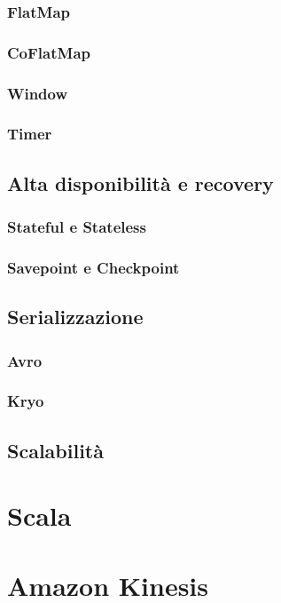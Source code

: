 		\subsubsection{FlatMap}
		\subsubsection{CoFlatMap}
		\subsubsection{Window}
		\subsubsection{Timer}


\subsection{Alta disponibilità e recovery}

	\subsubsection{Stateful e Stateless}

	\subsubsection{Savepoint e Checkpoint}

\subsection{Serializzazione}

	\subsubsection{Avro}

	\subsubsection{Kryo}


\subsection{Scalabilità}


\section{Scala}

\section{Amazon Kinesis}

